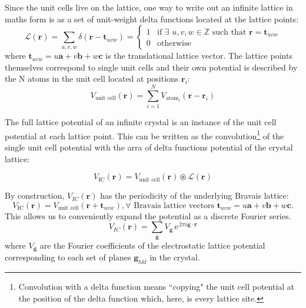 Since the unit cells live on the lattice, one way to write out an infinite lattice in maths form is as a set of unit-weight delta functions located at the lattice points:
\begin{equation}
\mathcal{L}(\mathbf{r}) = \sum_{u,v,w} \delta(\mathbf{r}-\mathbf{t}_{uvw})= \begin{cases} 1 & \mbox{if }	\exists \, \, u, v, w \in  \mathbb{Z} \mbox{ such that  }  \mathbf{r}=\mathbf{t}_{uvw} \\
																						  0 & \mbox{otherwise }
																							\end{cases}
\end{equation}
where $\mathbf{t}_{uvw} =  u\mathbf{a} + v\mathbf{b} + w\mathbf{c}$ is the translational lattice vector. The lattice points themselves correspond to single unit cells and their own potential is described by the N atoms in the unit cell located at positions $\mathbf{r}_i$:
\begin{equation}
V_{\text{unit cell}}(\mathbf{r}) = \sum_{i=1}^{N} V_{\text{atom}_i}(\mathbf{r}- \mathbf{r}_i)
\end{equation}

The full lattice potential of an infinite crystal is an instance of the unit cell potential at each lattice point. This can be written as the convolution\footnote{ Convolution with a delta function means ``copying" the unit cell potential at the position of the delta function which, here, is every lattice site.} of the single unit cell potential with the arra of delta functions potential of the crystal lattice:

\begin{equation}
V_{\text{IC}}(\mathbf{r} ) = V_{\text{unit cell}}(\mathbf{r})  \circledast  \mathcal{L}(\mathbf{r})
\end{equation}

By construction, $V_{IC}(\mathbf{r})$ has the periodicity of the underlying Bravais lattice:
\begin{equation}
V_{\text{IC}}(\mathbf{r} ) = V_{\text{unit cell}}(\mathbf{r} + \mathbf{t}_{uvw} ),  \forall \text{ Bravais lattice vectors } \mathbf{t}_{uvw} = u\mathbf{a} + v\mathbf{b} + w\mathbf{c}.
\end{equation}
This allows us to conveniently expand the potential as a discrete Fourier series.
\begin{equation}
V_{IC}(\mathbf{r} ) = \sum_{\mathbf{g}} V_{\mathbf{g}} \, \mathrm{e}^{\, 2\pi i \mathbf{g}\cdot \mathbf{r}}
\end{equation}
where $V_{\mathbf{g}}$ are the Fourier coefficients of the electrostatic lattice potential corresponding to each set of planes $\mathbf{g}_{hkl}$ in the crystal. 

